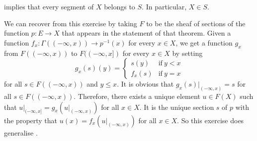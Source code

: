 \documentclass{article}
\begin{document}
\begin{solution}[\ref{exe:x9ewqbv6}]
   implies that every segment of \(X\) belongs to
  \(S\).  In particular, \(X \in S\).

  We can recover  from this exercise by taking
  \(F\) to be the sheaf of sections of the function \(p : E \to X\)
  that appears in the statement of that theorem.  Given a function
  \(f_x : \Gamma((-\infty, x)) \to p^{-1}(x)\) for every \(x \in X\),
  we get a function \(g_x\) from \(F((-\infty,x))\) to
  \(F((-\infty, x])\) for every \(x \in X\) by setting
  \begin{displaymath}
    g_x(s)(y) =
    \begin{cases}
      s(y) & \text{if} ~ y < x \\
      f_x(s) & \text{if} ~ y = x
    \end{cases}
  \end{displaymath}
  for all \(s \in F((-\infty, x))\) and \(y \leq x\).  It is obvious
  that \(g_x(s) \vert_{(-\infty, x)} = s\) for all
  \(s \in F((-\infty, x))\).  Therefore, there exists a unique element
  \(u \in F(X)\) such that
  \(u \vert_{(-\infty, x]} = g_x(u \vert_{(-\infty, x)})\) for all
  \(x \in X\).  It is the unique section \(s\) of \(p\) with the
  property that \(u(x) = f_x(u \vert_{(-\infty, x)})\) for all
  \(x \in X\).  So this exercise does generalise .
\end{solution}
\end{document}
